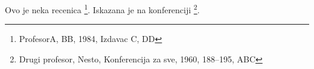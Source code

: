\documentclass{article}
\begin{document}
Ovo je neka recenica \footnote{ProfesorA, BB, 1984, Izdavac C, DD}.
Iskazana je na konferenciji \footnote{Drugi profesor, Nesto, Konferencija za sve, 1960, 188--195, ABC}.
\end{document}
